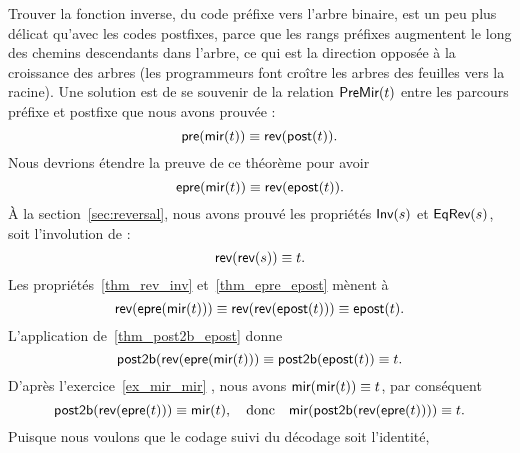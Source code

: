 Trouver la fonction inverse, du code préfixe vers l'arbre binaire, est
un peu plus délicat qu'avec les codes postfixes, parce que les rangs
préfixes augmentent le long des chemins descendants dans l'arbre, ce
qui est la direction opposée à la croissance des arbres (les
programmeurs font croître les arbres des feuilles vers la racine). Une
solution est de se souvenir de la relation
\(\textsf{PreMir}({t})\) entre les
parcours préfixe et postfixe que nous avons prouvée
:
\begin{equation*}
\abovedisplayskip=7pt
\belowdisplayskip=7pt
\fun{pre}(\fun{mir}(t)) \equiv \fun{rev}(\fun{post}(t)).
\end{equation*}
Nous devrions étendre la preuve de ce théorème pour avoir
\begin{equation}
\abovedisplayskip=7pt
\belowdisplayskip=7pt
\fun{epre}(\fun{mir}(t)) \equiv \fun{rev}(\fun{epost}(t)).
\label{thm_epre_epost}
\index{rev@\fun{rev/1}}
\end{equation}
À la section~\ref{sec:reversal}, nous avons prouvé les propriétés
\(\textsf{Inv}({s})\) et
\(\textsf{EqRev}({s})\), soit l'involution
de
:
\begin{equation}
\abovedisplayskip=7pt
\belowdisplayskip=7pt
\fun{rev}(\fun{rev}(s)) \equiv t.
\label{thm_rev_inv}
\end{equation}
Les propriétés~\eqref{thm_rev_inv} et~\eqref{thm_epre_epost} mènent à
\begin{equation*}
\abovedisplayskip=7pt
\belowdisplayskip=7pt
\fun{rev}(\fun{epre}(\fun{mir}(t))) \equiv
\fun{rev}(\fun{rev}(\fun{epost}(t))) \equiv \fun{epost}(t).
\end{equation*}
L'application de~\eqref{thm_post2b_epost} donne
\begin{equation*}
\abovedisplayskip=7pt
\belowdisplayskip=7pt
\fun{post2b}(\fun{rev}(\fun{epre}(\fun{mir}(t))) \equiv
\fun{post2b}(\fun{epost}(t)) \equiv t.
\end{equation*}
D'après l'exercice~\ref{ex_mir_mir} , nous avons
\(\textsf{mir}(\textsf{mir}(t)) \equiv t\), par conséquent
\begin{equation*}
\abovedisplayskip=7pt
\belowdisplayskip=7pt
\fun{post2b}(\fun{rev}(\fun{epre}(t))) \equiv \fun{mir}(t),
\quad\text{donc}\quad
\fun{mir}(\fun{post2b}(\fun{rev}(\fun{epre}(t)))) \equiv t.
\end{equation*}
Puisque nous voulons que le codage suivi du décodage soit l'identité,
